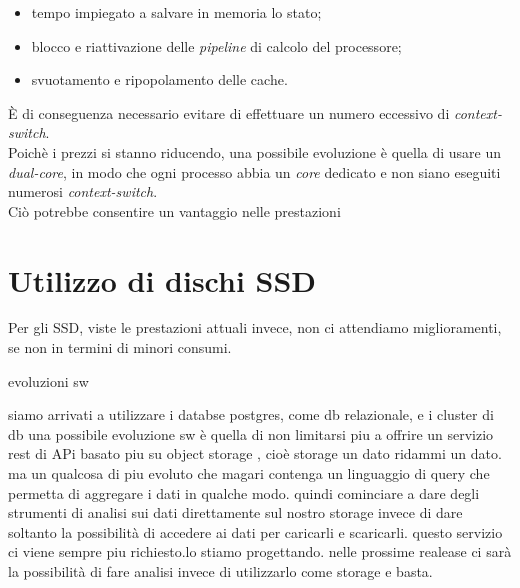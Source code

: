 \begin{itemize}
\item 
tempo impiegato a salvare in memoria lo stato;
\item
blocco e riattivazione delle \textit{pipeline} di calcolo del processore;
\item 
svuotamento e ripopolamento delle cache.
\end{itemize}

\`{E} di conseguenza necessario evitare di effettuare un numero eccessivo di \textit{context-switch}.\\

Poich\`{e} i prezzi si stanno riducendo, una possibile evoluzione \`{e} quella di usare un \textit{dual-core}, in modo che ogni processo abbia un \textit{core} dedicato e non siano eseguiti numerosi \textit{context-switch}.\\
Ci\`{o} potrebbe consentire un vantaggio nelle prestazioni

\section{Utilizzo di dischi SSD}
Per gli SSD, viste le prestazioni attuali invece, non ci attendiamo miglioramenti, se non in termini di minori consumi.




evoluzioni sw


siamo arrivati a utilizzare i databse postgres, come db relazionale, e i cluster di db una possibile evoluzione sw è quella di non limitarsi piu a offrire un servizio rest di APi basato piu su object storage , cioè storage un dato ridammi un dato. ma un qualcosa di piu evoluto che magari contenga un linguaggio di query che permetta di aggregare i dati in qualche modo. quindi cominciare a dare degli strumenti di analisi sui dati direttamente sul nostro storage invece di dare soltanto la possibilità di accedere ai dati per caricarli e scaricarli.
questo servizio ci viene sempre piu richiesto.lo stiamo progettando.
nelle prossime realease ci sarà la possibilità di fare analisi invece di utilizzarlo come storage e basta. 





